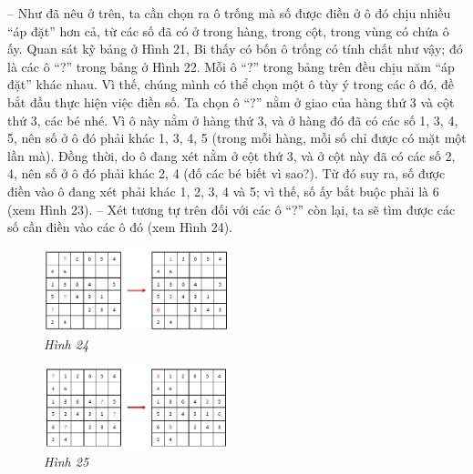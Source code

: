 	-- Như đã nêu ở trên, ta cần chọn ra ô trống mà số được điền ở ô đó chịu nhiều “áp đặt” hơn cả, từ các số đã có ở trong hàng, trong cột, trong vùng có chứa ô ấy. Quan sát kỹ bảng ở Hình 21, Bi thấy có bốn ô trống có tính chất như vậy; đó là các ô “?” trong bảng ở Hình 22.
	\vskip 0.1cm
	Mỗi ô “?” trong bảng trên đều chịu năm “áp đặt” khác nhau. Vì thế, chúng mình có thể chọn một ô tùy ý trong các ô đó, đề bắt đầu thực hiện việc điền số. Ta chọn ô “?” nằm ở giao của hàng thứ 3 và cột thứ 3, các bé nhé. Vì ô này nằm ở hàng thứ 3, và ở hàng đó đã có các số 1, 3, 4, 5, nên số ở ô đó phải khác 1, 3, 4, 5 (trong mỗi hàng, mỗi số chỉ được có mặt một lần mà). Đồng thời, do ô đang xét nằm ở cột thứ 3, và ở cột này đã có các số 2, 4, nên số ở ô đó phải khác 2, 4 (đố các bé biết vì sao?). Từ đó suy ra, số được điền vào ô đang xét phải khác 1, 2, 3, 4 và 5; vì thế, số ấy bắt buộc phải là 6 (xem Hình 23).
	\vskip 0.1cm
	-- Xét tương tự trên đối với các ô “?” còn lại, ta sẽ tìm được các số cần điền vào các ô đó (xem Hình 24).
	\begin{multicols}{2}
		\begin{figure}[H]
			\centering
			\vspace*{-10pt}
			\captionsetup{labelformat= empty, justification=centering}
			\includegraphics[width=0.48\textwidth]{pic13}
			\caption{\small\textit{Hình 24}}
			\vspace*{-5pt}
		\end{figure}
		\begin{figure}[H]
			\centering
			\vspace*{-10pt}
			\captionsetup{labelformat= empty, justification=centering}
			\includegraphics[width=0.48\textwidth]{pic14}
			\caption{\small\textit{Hình 25}}
			\vspace*{-5pt}
		\end{figure}
	\end{multicols}
